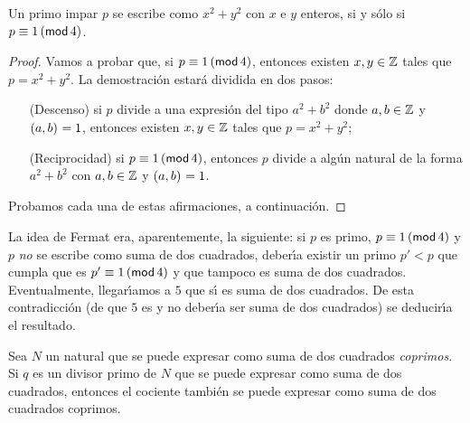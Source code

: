 \begin{teoFermat}\label{teo:fermat}
	Un primo impar $p$ se escribe como $x^2+y^2$ con $x$ e $y$ enteros,
	si y s\'olo si $p\equiv 1\tmodulo[4]$.
\end{teoFermat}

\begin{proof}
	Vamos a probar que, si $p\equiv 1\tmodulo[4]$, entonces existen
	$x,y\in\Enteros$ tales que $p=x^2+y^2$. La demostraci\'on estar\'a
	dividida en dos pasos:
	\begin{itemize}
		\item[(Descenso)]
			si $p$ divide a una expresi\'on del tipo $a^2+b^2$
			donde $a,b\in\Enteros$ y $\mcd{a,b}=1$, entonces
			existen $x,y\in\Enteros$ tales que $p=x^2+y^2$;
		\item[(Reciprocidad)]
			si $p\equiv 1\tmodulo[4]$, entonces $p$ divide a
			alg\'un natural de la forma $a^2+b^2$ con
			$a,b\in\Enteros$ y $\mcd{a,b}=1$.
	\end{itemize}
	Probamos cada una de estas afirmaciones, a continuaci\'on.
\end{proof}

La idea de Fermat era, aparentemente, la siguiente: si $p$ es primo,
$p\equiv 1\tmodulo[4]$ y $p$ \emph{no} se escribe como suma de dos cuadrados,
deber\'{\i}a existir un primo $p'<p$ que cumpla que es $p'\equiv 1\tmodulo[4]$
y que tampoco es suma de dos cuadrados. Eventualmente, llegar\'{\i}amos a $5$
que s\'{\i} es suma de dos cuadrados. De esta contradicci\'on
(de que $5$ es y no deber\'{\i}a ser suma de dos cuadrados) se deducir\'{\i}a
el resultado.

\begin{lemaFermat}\label{lema:fermat:descenso:pre}
	Sea $N$ un natural que se puede expresar como suma de dos cuadrados
	\emph{coprimos}. Si $q$ es un divisor primo de $N$ que se puede
	expresar como suma de dos cuadrados, entonces el cociente tambi\'en
	se puede expresar como suma de dos cuadrados coprimos.
\end{lemaFermat}

